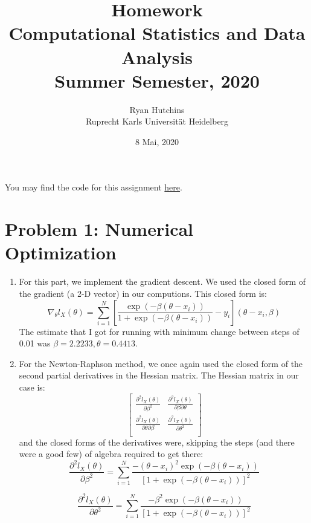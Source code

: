 \documentclass[a4paper,12pt]{article}
\title{
	Homework  \\
	\large Computational Statistics and Data Analysis \\
	\large Summer Semester, 2020
	}
\author{Ryan Hutchins \\ 
Ruprecht Karls Universit\"at Heidelberg}
\date{8 Mai, 2020}
\begin{document}
\maketitle

You may find the code for this assignment \href{https://github.com/GoliathMarks/Computational_Statistics/tree/master/HomeworkFour}{here}.

\section{Problem 1: Numerical Optimization}

\begin{enumerate}
\item For this part, we implement the gradient descent. We used the closed form of the gradient (a 2-D vector) in our computions. This closed form is:
\begin{equation}
\nabla_{\theta}l_{X}(\theta) = \sum_{i=1}^{N}{\left[ \frac{ \exp(-\beta (\theta -x_{i})) } { 1 + \exp(-\beta (\theta -x_{i})) } - y_{i}  \right] \left( \theta - x_{i}, \beta  \right)  }
\end{equation}
The estimate that I got for running with minimum change between steps of 0.01 was $\beta = 2.2233, \theta =0.4413$.


\item For the Newton-Raphson method, we once again used the closed form of the second partial derivatives in the Hessian matrix. The Hessian matrix in our case is:
$$
\begin{bmatrix}
\frac{\partial^{2}l_{X}(\theta)}{\partial \beta^{2}} & \frac{\partial^{2}l_{X}(\theta)}{\partial \beta \partial \theta} \\
\frac{\partial^{2}l_{X}(\theta)}{\partial \theta \partial \beta} & \frac{\partial^{2}l_{X}(\theta)}{\partial \theta^{2}} \\
\end{bmatrix}
$$
and the closed forms of the derivatives were, skipping the steps (and there were a good few) of algebra required to get there:
\begin{equation}
\frac{\partial^{2}l_{X}(\theta)}{\partial \beta^{2}} = \sum_{i=1}^{N}{  \frac{ -(\theta - x_{i})^{2}  \exp(-\beta (\theta -x_{i}))   }{\left[  1 + \exp(-\beta (\theta -x_{i}))   \right]^{2} }  }
\end{equation}

\begin{equation}
\frac{\partial^{2}l_{X}(\theta)}{\partial \theta^{2}} = \sum_{i=1}^{N}{  \frac{  -\beta^{2} \exp(-\beta (\theta -x_{i})) }  {\left[  1 + \exp(-\beta (\theta -x_{i}))   \right]^{2} }  }
\end{equation}


\end{enumerate}
\end{document}
